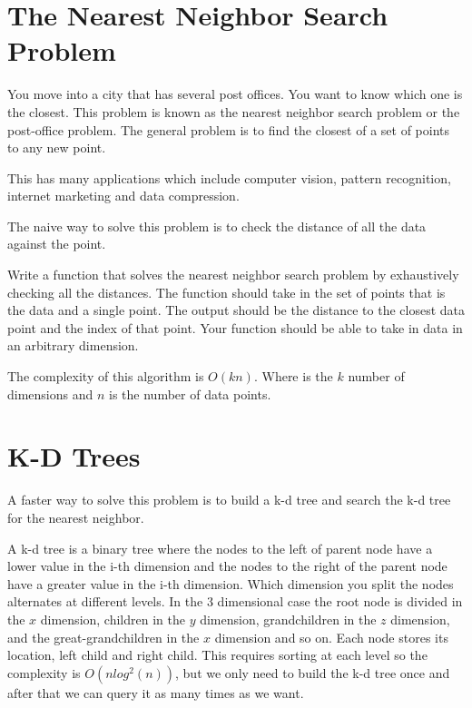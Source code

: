 \label{lab:NNS}


\section*{The Nearest Neighbor Search Problem}

You move into a city that has several post offices.
You want to know which one is the closest.
This problem is  known as the nearest neighbor search problem or the post-office problem.
The general problem is to find the closest of a set of points to any new point.

This has many applications which include computer vision, pattern recognition, internet marketing and data compression.

The naive way to solve this problem is to check the distance of all the data against the point.

\begin{problem}
Write a function that solves the nearest neighbor search problem by exhaustively checking all the distances.
The function should take in the set of points that is the data and a single point.
The output should be the distance to the closest data point and the index of that point.
Your function should be able to take in data in an arbitrary dimension.
\end{problem}

The complexity of this algorithm is $O(kn)$.
Where  is the $k$ number of dimensions and $n$ is the number of data points.

\section*{K-D Trees}

A faster way to solve this problem is to build a k-d tree and search the k-d tree for the nearest neighbor. 

A k-d tree is a binary tree where the nodes to the left of parent node have a lower value in the i-th dimension and the nodes to the right of the parent node have a greater value in the i-th dimension.
Which dimension you split the nodes alternates at different levels.
In the $3$ dimensional case the root node is divided in the $x$ dimension, children in the $y$ dimension, grandchildren in the $z$ dimension, and the great-grandchildren in the $x$ dimension and so on.
Each node stores its location, left child and right child.
This requires sorting at each level so the complexity is $O(n log^2(n))$, but we only need to build the k-d tree once and after that we can query it as many times as we want.

